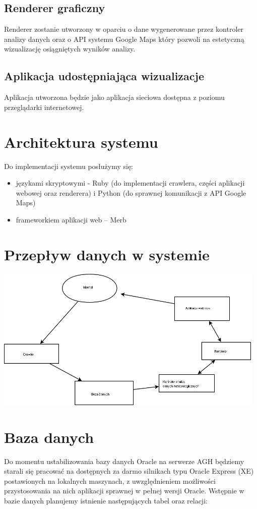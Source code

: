 \documentclass[12pt]{article}
\begin{document}
\subsection{Renderer graficzny}
Renderer zostanie utworzony w oparciu o dane wygenerowane przez kontroler
analizy danych oraz o API systemu Google Maps który pozwoli na estetyczną
wizualizację osiągniętych wyników analizy.

\subsection{Aplikacja udostępniająca wizualizacje}
Aplikacja utworzona będzie jako aplikacja sieciowa dostępna z poziomu
przeglądarki internetowej.

\section{Architektura systemu}

Do implementacji systemu posłużymy się:
\begin{itemize}
\item językami skryptowymi - Ruby (do implementacji crawlera, części aplikacji
    webowej oraz renderera) i Python (do sprawnej komunikacji z API Google
      Maps)
\item frameworkiem aplikacji web -- Merb
\end{itemize}


\section{Przepływ danych w systemie}
\includegraphics[width=35em]{images/data_flow_diagram.png}

\section{Baza danych}
Do momentu ustabilizowania bazy danych Oracle na serwerze AGH będziemy starali
się pracować na dostępnych za darmo silnikach typu Oracle Express (XE)
  postawionych na lokalnych maszynach, z uwzględnieniem możliwości
  przystosowania na nich aplikacji sprawnej w pełnej wersji Oracle. Wstępnie w
  bazie danych planujemy istnienie następujących tabel oraz relacji:
\end{document}
